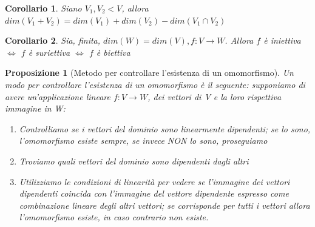 \documentclass[12pt]{article}
\newenvironment{para}{\begin{adjustwidth}{13mm}{}}{\end{adjustwidth}}
\newtheorem{Corollario}{Corollario}[subsection]
\newtheorem{Proposizione}{Proposizione}[subsection]
\begin{document}
\begin{para}
\begin{Corollario}
    Siano $V_1, V_2 < V$, allora $dim(V_1+V_2)=dim(V_1)+dim(V_2)-dim(V_1 \cap V_2)$
\end{Corollario}
\begin{Corollario}
    Sia, finita, $dim(W)=dim(V), f:V \rightarrow W$. Allora $f$ è iniettiva $\Leftrightarrow$ $f$ è suriettiva $\Leftrightarrow$ $f$ è biettiva
\end{Corollario}
\begin{Proposizione}[Metodo per controllare l'esistenza di un omomorfismo] Un modo per controllare l'esistenza di un omomorfismo è il seguente: supponiamo di avere un'applicazione lineare $f:V\rightarrow W$, dei vettori di V e la loro rispettiva immagine in W:
\begin{enumerate}
    \item Controlliamo se i vettori del dominio sono linearmente dipendenti; se lo sono, l'omomorfismo esiste sempre, se invece NON lo sono, proseguiamo
    \item Troviamo quali vettori del dominio sono dipendenti dagli altri
    \item Utilizziamo le condizioni di linearità per vedere se l'immagine dei vettori dipendenti coincida con l'immagine del vettore dipendente espresso come combinazione lineare degli altri vettori; se corrisponde per tutti i vettori allora l'omomorfismo esiste, in caso contrario non esiste.
\end{enumerate}
    
\end{Proposizione}

\end{para}
\end{document}
